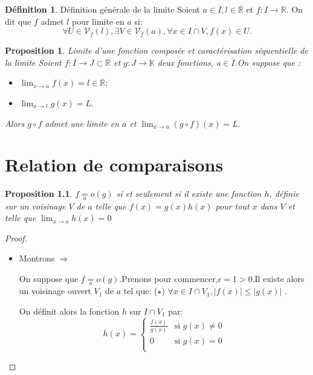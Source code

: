 \documentclass[12pt]{book}
\theoremstyle{definition}\newtheorem{dfn}{Définition}[chapter]
\theoremstyle{plain}\newtheorem{thm}{Théorème}[chapter]
\theoremstyle{plain}\newtheorem{prp}{Proposition}[chapter]
\theoremstyle{plain}\newtheorem{lem}{\bf Lemme}[chapter]
\theoremstyle{plain}\newtheorem{axm}{\bf Axiome}[chapter]
\theoremstyle{plain}\newtheorem{lmm}{\bf Lemme}[chapter]
\theoremstyle{plain}\newtheorem{exm}{\bf Example}[chapter]
\theoremstyle{plain}\newtheorem{cor}{\bf Corollaire}[chapter]
\theoremstyle{remark}\newtheorem{rem}{Remarque}[chapter]
\begin{document}
\begin{dfn}{Définition générale de la limite}
        Soient $a\in \overline{I},l\in \overline{\mathbb{R}}$ et $f:I\rightarrow \mathbb{R}.$ On dit que $f$ admet $l$ pour limite en $a$ si:
                $$
                \forall U\in \mathcal{V}_{f}(l),\exists V\in
                \mathcal{V}_{f}(a), \forall x\in I\cap V, f(x)\in U.
                $$
\end{dfn}

\begin{prp}{Limite d'une fonction composée et caractérisation séquentielle de la limite}
Soient $f:I\rightarrow J\subset \mathbb{R}$ et $g:J\rightarrow\mathbb{K}$ deux fonctions, a$\in \overline{I}$.On suppose que :

\begin{itemize}
\item[1.] $\lim_{x\to a}f(x)=l\in \overline{\mathbb{R}};$
\item[2.] $\lim_{x\to l}g(x)=L.$
\end{itemize}

Alors $g\circ f$ admet une limite en $a$ et $\lim_{x\to a}(g\circ f)(x)=L.$

\end{prp}

\chapter{Relation de comparaisons}
\begin{prp}
$f\underset{a}{=}o(g)$ si et seulement si il existe une fonction $h$, définie sur un voisinage $V$ de $a$ telle que $f(x)=g(x)h(x)$ pour tout $x$ dans $V$ et telle que $\lim_{x\to a}h(x)=0$
\end{prp}
\begin{proof}
        \begin{itemize}
\item Montrons $\Rightarrow$

On suppose que $f\underset{a}{=}o(g)$.Prenons pour commencer,$\epsilon=1>0$.Il existe alors un voisinage ouvert $V_1$ de $a$ tel que: ($\star$) $\forall x\in I\cap V_1,\left |f(x)\right |\le \left |g(x)\right |$ .

On définit alors la fonction $h$ sur $I\cap V_1$ par:
\begin{equation*}
h(x)=
\begin{cases}
\frac{f(x)}{g(x)} &\mbox{si $g(x)\not=0$}\\
0 &\mbox{si $g(x)=0$}\\
\end{cases}
\end{equation*}
        \end{itemize}
\end{proof}
\end{document}

